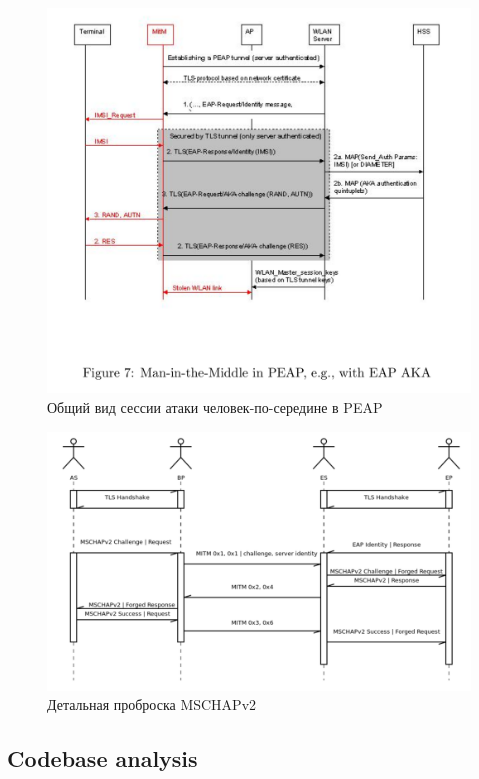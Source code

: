 \documentclass{extarticle}
\begin{document}
\begin{figure}
  \centering \includegraphics{res/peap-mitm-general.png}
  \caption{Общий вид сессии атаки человек-по-середине в PEAP}
\end{figure}

\begin{figure}
  \centering \includegraphics[scale=0.5]{res/clarified-mschapv2-mitm-in-peap.png}
  \caption{Детальная проброска MSCHAPv2}
\end{figure}

\subsection{Codebase analysis}
\end{document}
